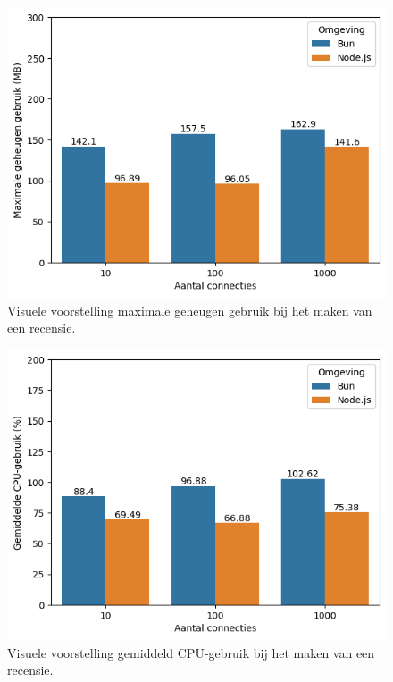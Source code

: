     \begin{figure}[H]
      \centering
      \includegraphics{graphics/PostMySqlRAM.png}
      \caption{\label{fig:postgeheugenmysql}Visuele voorstelling maximale geheugen gebruik bij het maken van een recensie.}
    \end{figure}
    \begin{figure}[H]
      \centering
      \includegraphics{graphics/PostMySqlCpu.png}
      \caption{\label{fig:postcpumysql}Visuele voorstelling gemiddeld CPU-gebruik bij het maken van een recensie.}
    \end{figure}
